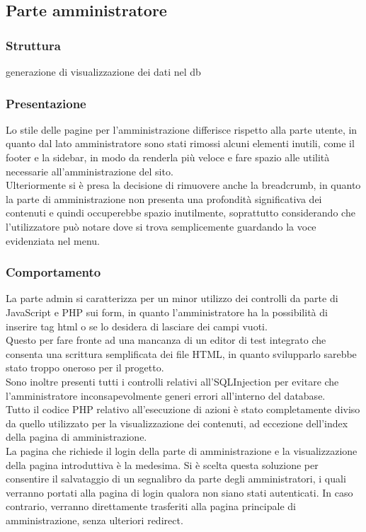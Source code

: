 \documentclass[openany, a4paper, 12pt]{report}
\begin{document}
	\subsection{Parte amministratore}
		\subsubsection{Struttura}
		generazione di visualizzazione dei dati nel db
		\subsubsection{Presentazione}
		Lo stile delle pagine per l'amministrazione differisce rispetto alla parte utente, in quanto dal lato amministratore sono stati rimossi alcuni elementi inutili, come il footer e la sidebar, in modo da renderla più veloce e fare spazio alle utilità necessarie all'amministrazione del sito.\\
		Ulteriormente si è presa la decisione di rimuovere anche la breadcrumb, in quanto la parte di amministrazione non presenta una profondità significativa dei contenuti e quindi occuperebbe spazio inutilmente, soprattutto considerando che l'utilizzatore può notare dove si trova semplicemente guardando la voce evidenziata nel menu.
		\subsubsection{Comportamento}
		La parte admin si caratterizza per un minor utilizzo dei controlli da parte di JavaScript e PHP sui form, in quanto l'amministratore ha la possibilità di inserire tag html o se lo desidera di lasciare dei campi vuoti.\\
		Questo per fare fronte ad una mancanza di un editor di test integrato che consenta una scrittura semplificata dei file HTML, in quanto svilupparlo sarebbe stato troppo oneroso per il progetto.\\
		Sono inoltre presenti tutti i controlli relativi all'SQLInjection per evitare che l'amministratore inconsapevolmente generi errori all'interno del database.\\
		Tutto il codice PHP relativo all'esecuzione di azioni è stato completamente diviso da quello utilizzato per la visualizzazione dei contenuti, ad eccezione dell'index della pagina di amministrazione.\\
		La pagina che richiede il login della parte di amministrazione e la visualizzazione della pagina introduttiva è la medesima. Si è scelta questa soluzione per consentire il salvataggio di un segnalibro da parte degli amministratori, i quali verranno portati alla pagina di login qualora non siano stati autenticati. In caso contrario, verranno direttamente trasferiti alla pagina principale di amministrazione, senza ulteriori redirect.
\end{document}
